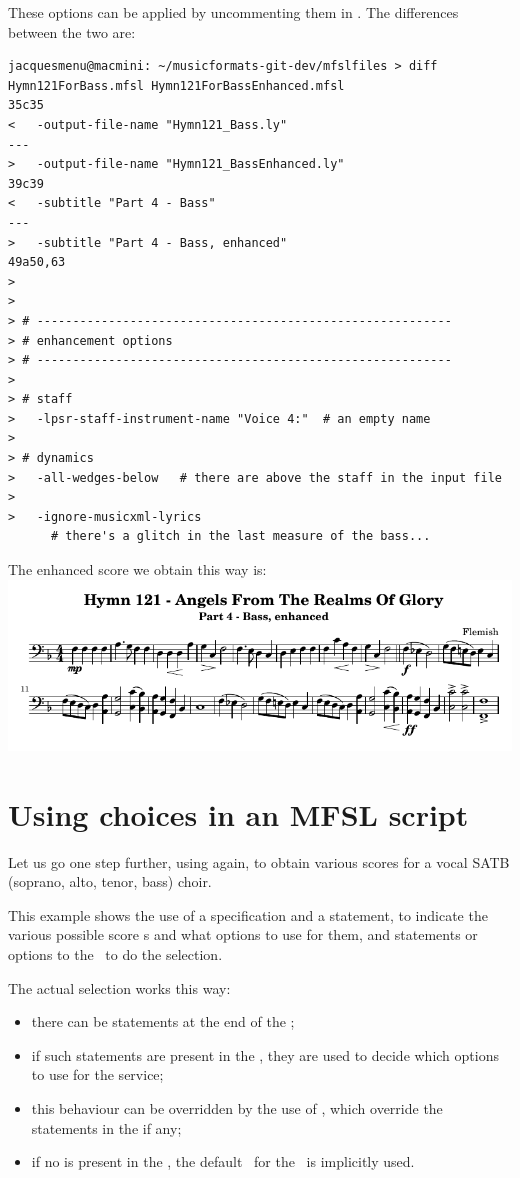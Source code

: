 These options can be applied by uncommenting them in . The differences between the two are:
\begin{lstlisting}[language=Terminal]
jacquesmenu@macmini: ~/musicformats-git-dev/mfslfiles > diff Hymn121ForBass.mfsl Hymn121ForBassEnhanced.mfsl
35c35
<   -output-file-name "Hymn121_Bass.ly"
---
>   -output-file-name "Hymn121_BassEnhanced.ly"
39c39
<   -subtitle "Part 4 - Bass"
---
>   -subtitle "Part 4 - Bass, enhanced"
49a50,63
>
>
> # ----------------------------------------------------------
> # enhancement options
> # ----------------------------------------------------------
>
> # staff
>   -lpsr-staff-instrument-name "Voice 4:"  # an empty name
>
> # dynamics
>   -all-wedges-below   # there are above the staff in the input file
>
>   -ignore-musicxml-lyrics
      # there's a glitch in the last measure of the bass...
\end{lstlisting}

The enhanced score we obtain this way is:\\
\includegraphics[scale=0.8]{../mfgraphics/Hymn121_BassEnhanced.png}


\section{Using choices in an MFSL script}

Let us go one step further, using  again, to obtain various scores for a vocal SATB (soprano, alto, tenor, bass) choir.

This example shows the use of a  specification and a  statement, to indicate the various possible score \choice s and what options to use for them, and  statements or options to the \mfslInterp\ to do the selection.

The actual selection works this way:
\begin{itemize}
\item there can be  statements at the end of the \script;
\item if such statements are present in the \script, they are used to decide which options to use for the service;
\item this behaviour can be overridden by the use of , which override the  statements in the \script if any;
\item if no  is present in the \script, the default \coiceLabel\ for the \choice\ is implicitly used.
\end{itemize}

